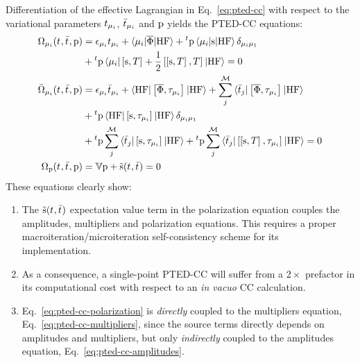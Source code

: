 Differentiation of the effective Lagrangian in Eq.~\eqref{eq:pted-cc}
with respect to the variational parameters $t_{\mu_i}$,
$\bar{t}_{\mu_i}$ and $\mathrm{p}$ yields the \acs{PTED}-\acs{CC}
equations:
\begin{subequations}
  \begin{align}
   \Omega_{\mu_i}(t_{}, \bar{t}_{}, \mathrm{p})  &=
   \epsilon_{\mu_i}t_{\mu_i} + \braket{\mu_i | \overline{\Phi} | \mathrm{HF}}
   + {}^t\mathrm{p}\braket{\mu_i | \mathrm{s} | \mathrm{HF}}\delta_{\mu_i\mu_1} \nonumber \\
   &+ {}^t\mathrm{p}\braket{\mu_i | \left[ \mathrm{s}, T \right]^{} + \frac{1}{2}\left[ \left[ \mathrm{s}, T \right]^{}, T \right]^{} | \mathrm{HF}}
             = 0 \label{eq:pted-cc-amplitudes}\\
   \bar{\Omega}_{\mu_i}(t_{}, \bar{t}_{}, \mathrm{p})
    &=
    \epsilon_{\mu_i}\bar{t}_{\mu_i} +
    \braket{\mathrm{HF} | \left[ \overline{\Phi}, \tau_{\mu_i} \right]^{} | \mathrm{HF}} +
    \sum_{j}^{\mathcal{M}}\braket{\bar{t}_{j} |
    \left[ \overline{\Phi}, \tau_{\mu_i} \right]^{} | \mathrm{HF}}
    \nonumber \\
    &+
    {}^t\mathrm{p}\braket{\mathrm{HF} | \left[ \mathrm{s}, \tau_{\mu_i} \right]^{} | \mathrm{HF}}\delta_{\mu_i\mu_1} \nonumber \\
    &+
    {}^t\mathrm{p}\sum_{j}^{\mathcal{M}}\braket{\bar{t}_{j} | \left[ \mathrm{s}, \tau_{\mu_i} \right]^{} | \mathrm{HF}}
    +
    {}^t\mathrm{p}\sum_{j}^{\mathcal{M}}\braket{\bar{t}_{j} | \left[ \left[ \mathrm{s}, T \right]^{}, \tau_{\mu_i} \right]^{} | \mathrm{HF}}
             = 0 \label{eq:pted-cc-multipliers}\\
    \Omega_{\mathrm{p}}(t_{}, \bar{t}_{}, \mathrm{p})
    &=
    \mathbb{V}\mathrm{p} + \tilde{\mathrm{s}}(t_{}, \bar{t}_{}) = 0
    \label{eq:pted-cc-polarization}
  \end{align}
\end{subequations}
These equations clearly show:
\begin{enumerate}
  \item The $\tilde{\mathrm{s}}(t_{}, \bar{t}_{})$ expectation value term in the
    polarization equation couples the amplitudes, multipliers and
    polarization equations.
    This requires a proper macroiteration/microiteration
    self-consistency scheme for its implementation.~\autocite{Cammi2009-gu, Caricato2010-hx}
  \item As a consequence, a single-point \acs{PTED}-\acs{CC} will
    suffer from a $2\times$ prefactor in its computational cost with
    respect to an \emph{in vacuo} \acs{CC} calculation.
  \item Eq.~\eqref{eq:pted-cc-polarization} is \emph{directly} coupled to
    the multipliers equation, Eq.~\eqref{eq:pted-cc-multipliers}, since
    the source terms directly depends on amplitudes and multipliers, but
    only \emph{indirectly} coupled to the amplitudes equation,
    Eq.~\eqref{eq:pted-cc-amplitudes}.
\end{enumerate}

